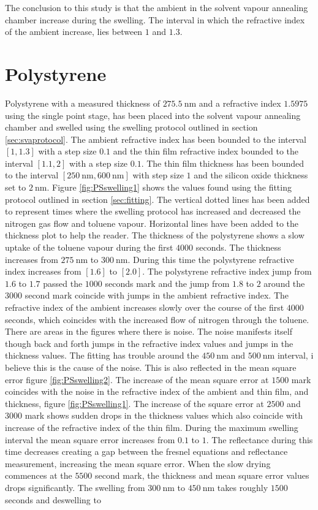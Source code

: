 \documentclass[MasterThesisMain.tex]{subfiles}
\begin{document}
The conclusion to this study is that the ambient in the solvent vapour annealing chamber increase during the swelling. The interval in which the refractive index of the ambient increase, lies between $1$ and $1.3$. 
	
\section{Polystyrene}
Polystyrene with a measured thickness of $\SI{275.5}{\nano\meter}$ and a refractive index $1.5975$ using the single point stage, has been placed into the solvent vapour annealing chamber and swelled using the swelling protocol outlined in section \ref{sec:svaprotocol}. The ambient refractive index has been bounded to the interval $[1,1.3]$ with a step size $0.1$ and the thin film refractive index bounded to the interval $[1.1,2]$ with a step size $0.1$. The thin film thickness has been bounded to the interval $[\SI{250}{\nano\meter},\SI{600}{\nano\meter}]$ with step size $1$ and the silicon oxide thickness set to $\SI{2}{\nano\meter}$. Figure \ref{fig:PSswelling1} shows the values found using the fitting protocol outlined in section \ref{sec:fitting}. The vertical dotted lines has been added to represent times where the swelling protocol has increased and decreased the nitrogen gas flow and toluene vapour. Horizontal lines have been added to the thickness plot to help the reader. The thickness of the polystyrene shows a slow uptake of the toluene vapour during the first $4000$ seconds. The thickness increases from $\SI{275}{\nano\meter}$ to $\SI{300}{\nano\meter}$. During this time the polystyrene refractive index increases from $[1.6]$ to $[2.0]$. The polystyrene refractive index jump from $1.6$ to $1.7$ passed the $1000$ seconds mark and the jump from $1.8$ to $2$ around the $3000$ second mark coincide with jumps in the ambient refractive index. The refractive index of the ambient increases slowly over the course of the first $4000$ seconds, which coincides with the increased flow of nitrogen through the toluene. There are areas in the figures where there is noise. The noise manifests itself though back and forth jumps in the refractive index values and jumps in the thickness values. The fitting has trouble around the $\SI{450}{\nano\meter}$ and $\SI{500}{\nano\meter}$ interval, i believe this is the cause of the noise. This is also reflected in the mean square error figure \ref{fig:PSswelling2}. The increase of the mean square error at $1500$ mark coincides with the noise in the refractive index of the ambient and thin film, and thickness, figure \ref{fig:PSswelling1}. The increase of the square error at $2500$ and $3000$ mark shows sudden drops in the thickness values which also coincide with increase of the refractive index of the thin film. During the maximum swelling interval the mean square error increases from $0.1$ to $1$. The reflectance during this time decreases creating a gap between the fresnel equations and reflectance measurement, increasing the mean square error. When the slow drying commences at the $5500$ second mark, the thickness and mean square error values drops significantly. The swelling from $\SI{300}{\nano\meter}$ to $\SI{450}{\nano\meter}$ takes roughly $1500$ seconds and deswelling to 
\end{document}
